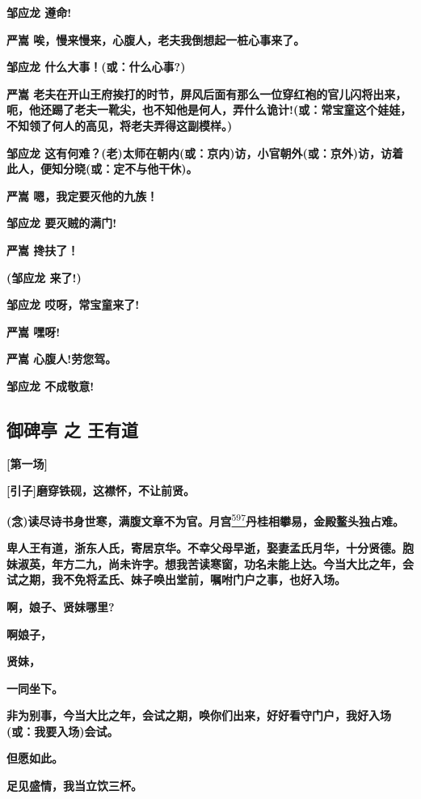\textbf{邹应龙 遵命!}

\textbf{严嵩 唉，慢来慢来，心腹人，老夫我倒想起一桩心事来了。}

\textbf{邹应龙 什么大事！(或：什么心事?)}

\textbf{严嵩
老夫在开山王府挨打的时节，屏风后面有那么一位穿红袍的官儿闪将出来，呃，他还踢了老夫一靴尖，也不知他是何人，弄什么诡计!(或：常宝童这个娃娃，不知领了何人的高见，将老夫弄得这副模样。)}

\textbf{邹应龙
这有何难？(老)太师在朝内(或：京内)访，小官朝外(或：京外)访，访着此人，便知分晓(或：定不与他干休)。}

\textbf{严嵩 嗯，我定要灭他的九族！}

\textbf{邹应龙 要灭贼的满门!}

\textbf{严嵩 搀扶了！}

\textbf{(邹应龙 来了!)}

\textbf{邹应龙 哎呀，常宝童来了!}

\textbf{严嵩 嘿呀!}

\textbf{严嵩 心腹人!劳您驾。}

\textbf{邹应龙 不成敬意!}

\newpage
\hypertarget{ux5fa1ux7891ux4ead-ux4e4b-ux738bux6709ux9053}{%
\subsection{御碑亭 之
王有道}\label{ux5fa1ux7891ux4ead-ux4e4b-ux738bux6709ux9053}}

\textbf{{[}第一场{]}}

\textbf{{[}引子{]}磨穿铁砚，这襟怀，不让前贤。}

\textbf{(念)读尽诗书身世寒，满腹文章不为官。月宫}\protect\hyperlink{fn597}{\textsuperscript{597}}\textbf{丹桂相攀易，金殿鳌头独占难。}

\textbf{卑人王有道，浙东人氏，寄居京华。不幸父母早逝，娶妻孟氏月华，十分贤德。胞妹淑英，年方二九，尚未许字。想我苦读寒窗，功名未能上达。今当大比之年，会试之期，我不免将孟氏、妹子唤出堂前，嘱咐门户之事，也好入场。}

\textbf{啊，娘子、贤妹哪里?}

\textbf{啊娘子，}

\textbf{贤妹，}

\textbf{一同坐下。}

\textbf{非为别事，今当大比之年，会试之期，唤你们出来，好好看守门户，我好入场(或：我要入场)会试。}

\textbf{但愿如此。}

\textbf{足见盛情，我当立饮三杯。}

